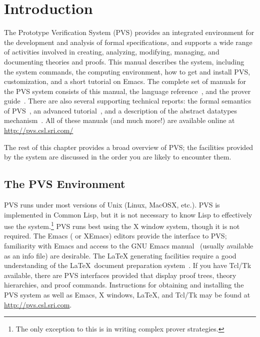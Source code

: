 \chapter{Introduction}
\label{introduction}

The Prototype Verification System (PVS) provides an integrated environment for the development and
analysis of formal specifications, and supports a wide range of activities
involved in creating, analyzing, modifying, managing, and documenting
theories and proofs.  This manual describes the system, including the
system commands, the computing environment, how to get and install PVS,
customization, and a short tutorial on Emacs.  The complete set of manuals
for the PVS system consists of this manual, the language
reference~\cite{PVS:language}, and the prover guide~\cite{PVS:prover}.
There are also several supporting technical reports: the formal semantics
of PVS~\cite{PVS:semantics}, an advanced
tutorial~\cite{Rushby&Stringer-Calvert95}, and a description of the
abstract datatypes mechanism~\cite{PVS-ADT:TR}.  All of these manuals (and
much more!) are available online at \url{http://pvs.csl.sri.com/}

The rest of this chapter provides a broad overview of PVS; the facilities
provided by the system are discussed in the order you are likely to
encounter them.

\section*{The PVS Environment}

PVS runs under most versions of Unix (Linux, MacOSX, etc.).  PVS is
implemented in Common Lisp, but it is not necessary to
know Lisp to effectively use the system.\footnote{The only exception to
  this is in writing complex prover strategies.}  PVS runs best using the
X window system, though it is not required.  The Emacs
(\gnuemacs{} or XEmacs) editors provide the
interface to PVS; familiarity with Emacs and access to the GNU Emacs
manual~\cite{emacs20} (usually available as an info file) are desirable.
The \LaTeX{} generating facilities require a good
understanding of the \LaTeX\ document preparation system~\cite{latex2e}.
If you have Tcl/Tk available, there are PVS interfaces provided that
display proof trees, theory hierarchies, and proof commands.  Instructions
for obtaining and installing
the PVS system as well as Emacs, X windows, \LaTeX, and Tcl/Tk may be
found at \url{http://pvs.csl.sri.com}.



